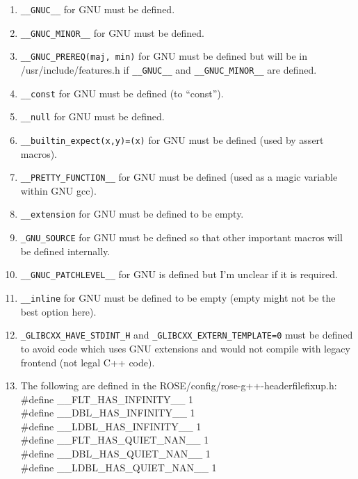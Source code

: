 {\begin{enumerate}
        \item {\tt \_\_GNUC\_\_} for GNU must be defined.

        \item {\tt \_\_GNUC\_MINOR\_\_} for GNU must be defined.

        \item {\tt \_\_GNUC\_PREREQ(maj, min)} for GNU must be defined but will be in
        /usr/include/features.h if {\tt \_\_GNUC\_\_} and {\tt \_\_GNUC\_MINOR\_\_} are defined.

        \item {\tt \_\_const} for GNU must be defined (to ``const'').

        \item {\tt \_\_null} for GNU must be defined.

        \item {\tt \_\_builtin\_expect(x,y)=(x)} for GNU must be defined (used by assert macros).

        \item {\tt \_\_PRETTY\_FUNCTION\_\_} for GNU must be defined (used as a magic
        variable within GNU gcc).

        \item {\tt \_\_extension} for GNU must be defined to be empty.

        \item {\tt \_GNU\_SOURCE} for GNU must be defined so that other important macros
        will be defined internally.

        \item {\tt \_\_GNUC\_PATCHLEVEL\_\_} for GNU is defined but I'm unclear if it is
        required.

        \item {\tt \_\_inline} for GNU must be defined to be empty (empty might not be the
        best option here).

        \item {\tt \_GLIBCXX\_HAVE\_STDINT\_H} and {\tt \_GLIBCXX\_EXTERN\_TEMPLATE=0}
        must be defined to avoid code which uses GNU extensions and would not compile with legacy frontend
        (not legal C++ code).

        \item The following are defined in the ROSE/config/rose-g++-headerfilefixup.h: \\
             \#define \_\_FLT\_HAS\_INFINITY\_\_ 1 \\
             \#define \_\_DBL\_HAS\_INFINITY\_\_ 1 \\
             \#define \_\_LDBL\_HAS\_INFINITY\_\_ 1 \\
             \#define \_\_FLT\_HAS\_QUIET\_NAN\_\_ 1 \\
             \#define \_\_DBL\_HAS\_QUIET\_NAN\_\_ 1 \\
             \#define \_\_LDBL\_HAS\_QUIET\_NAN\_\_ 1 

    \end{enumerate}
}

